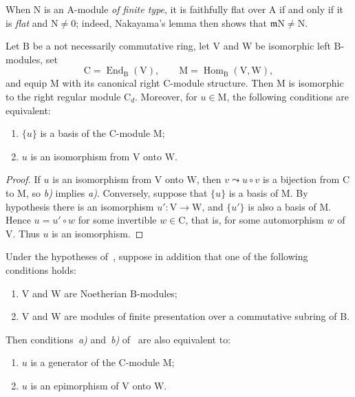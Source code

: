 \begin{remark}[2.5.5.4]
\label{IV.2.5.5.4}
When $\mathrm{N}$ is an $\mathrm{A}$-module \emph{of finite type}, it is
faithfully flat over $\mathrm{A}$ if and only if it is \emph{flat} and
$\mathrm{N}\neq0$; indeed, Nakayama's lemma then shows that
$\mathfrak{m}\mathrm{N}\neq\mathrm{N}$.
\end{remark}

\begin{lemma}[2.5.6]
\label{IV.2.5.6}
Let $\mathrm{B}$ be a not necessarily commutative ring, let $\mathrm{V}$
and $\mathrm{W}$ be isomorphic left $\mathrm{B}$-modules, set
\[
  \mathrm{C}=\operatorname{End}_{\mathrm{B}}(\mathrm{V}),\qquad
  \mathrm{M}=\operatorname{Hom}_{\mathrm{B}}(\mathrm{V},\mathrm{W}),
\]
and equip $\mathrm{M}$ with its canonical right
$\mathrm{C}$-module structure. Then $\mathrm{M}$ is isomorphic to the
right regular module $\mathrm{C}_d$. Moreover, for $u\in\mathrm{M}$,
the following conditions are equivalent:
\begin{enumerate}
  \item[\emph{a)}] $\{u\}$ is a basis of the $\mathrm{C}$-module
  $\mathrm{M}$;
  \item[\emph{b)}] $u$ is an isomorphism from $\mathrm{V}$ onto
  $\mathrm{W}$.
\end{enumerate}
\end{lemma}

\begin{proof}
If $u$ is an isomorphism from $\mathrm{V}$ onto $\mathrm{W}$, then
$v\leadsto u\circ v$ is a bijection from $\mathrm{C}$ to $\mathrm{M}$,
so \emph{b)} implies \emph{a)}. Conversely, suppose that $\{u\}$ is a
basis of $\mathrm{M}$. By hypothesis there is an isomorphism
$u':\mathrm{V}\to\mathrm{W}$, and $\{u'\}$ is also a basis of
$\mathrm{M}$. Hence $u=u'\circ w$ for some invertible $w\in\mathrm{C}$,
that is, for some automorphism $w$ of $\mathrm{V}$. Thus $u$ is an
isomorphism.
\end{proof}

\begin{corollary}[2.5.7]
\label{IV.2.5.7}
Under the hypotheses of~, suppose in addition that one of
the following conditions holds:
\begin{enumerate}
  \item[\textup{(i)}] $\mathrm{V}$ and $\mathrm{W}$ are Noetherian
  $\mathrm{B}$-modules;
  \item[\textup{(ii)}] $\mathrm{V}$ and $\mathrm{W}$ are modules of finite
  presentation over a commutative subring of $\mathrm{B}$.
\end{enumerate}
Then conditions~\emph{a)} and~\emph{b)} of~ are also
equivalent to:
\begin{enumerate}
  \item[\emph{a}$'$)] $u$ is a generator of the $\mathrm{C}$-module
  $\mathrm{M}$;
  \item[\emph{b}$'$)] $u$ is an epimorphism of $\mathrm{V}$ onto $\mathrm{W}$.
\end{enumerate}
\end{corollary}

